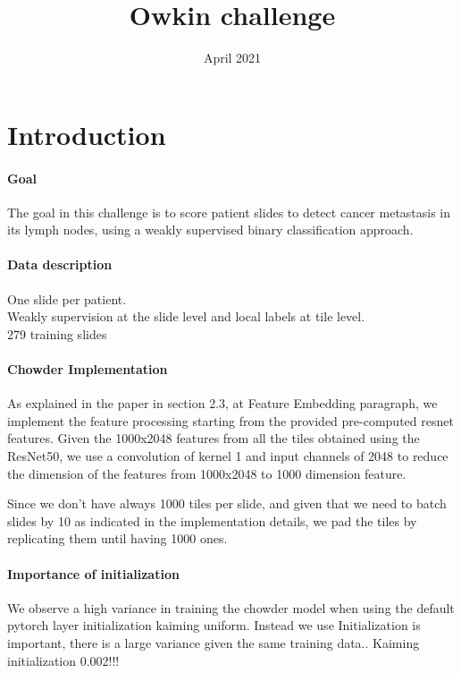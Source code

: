 \documentclass{article}
\title{Owkin challenge}
\author{ }
\date{April 2021}
\begin{document}
\maketitle

\section{Introduction}

\paragraph{Goal}
The goal in this challenge is to score patient slides to detect cancer metastasis in its lymph nodes, using a weakly supervised  binary classification approach.

\paragraph{Data description}
One slide per patient. \\
Weakly supervision at the slide level and local labels at tile level.\\
279 training slides


\paragraph{Chowder Implementation}
As explained in the paper in section 2.3, at Feature Embedding paragraph, we implement the feature processing starting from the provided pre-computed resnet features. 
Given the 1000x2048 features from all the tiles obtained using the ResNet50, we use a convolution of kernel 1 and input channels of 2048 to reduce the dimension of the features from 1000x2048 to 1000 dimension feature.

Since we don't have always 1000 tiles per slide, and given that we need to batch slides by 10 as indicated in the implementation details, we pad the tiles by replicating them until having 1000 ones.


\paragraph{Importance of initialization}
We observe a high variance in training the chowder model when using the default pytorch layer initialization kaiming uniform. Instead we use
Initialization is important, there is a large variance given the same training data..
Kaiming initialization 0.002!!!
\end{document}
